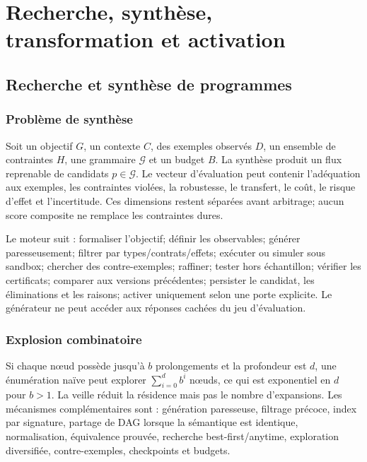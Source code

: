 \documentclass[11pt,a4paper,openany]{book}
\theoremstyle{definition}
\theoremstyle{plain}
\theoremstyle{remark}
\begin{document}
\part{Recherche, synthèse, transformation et activation}
\chapter{Recherche et synthèse de programmes}
\section{Problème de synthèse}
Soit un objectif $G$, un contexte $C$, des exemples observés $D$, un ensemble de contraintes $H$, une grammaire $\mathcal G$ et un budget $B$. La synthèse produit un flux reprenable de candidats $p\in\mathcal G$. Le vecteur d'évaluation peut contenir l'adéquation aux exemples, les contraintes violées, la robustesse, le transfert, le coût, le risque d'effet et l'incertitude. Ces dimensions restent séparées avant arbitrage; aucun score composite ne remplace les contraintes dures.

Le moteur suit : formaliser l'objectif; définir les observables; générer paresseusement; filtrer par types/contrats/effets; exécuter ou simuler sous sandbox; chercher des contre-exemples; raffiner; tester hors échantillon; vérifier les certificats; comparer aux versions précédentes; persister le candidat, les éliminations et les raisons; activer uniquement selon une porte explicite. Le générateur ne peut accéder aux réponses cachées du jeu d'évaluation.

\section{Explosion combinatoire}
Si chaque nœud possède jusqu'à $b$ prolongements et la profondeur est $d$, une énumération naïve peut explorer $\sum_{i=0}^{d}b^i$ nœuds, ce qui est exponentiel en $d$ pour $b>1$. La veille réduit la résidence mais pas le nombre d'expansions. Les mécanismes complémentaires sont : génération paresseuse, filtrage précoce, index par signature, partage de DAG lorsque la sémantique est identique, normalisation, équivalence prouvée, recherche best-first/anytime, exploration diversifiée, contre-exemples, checkpoints et budgets.
\end{document}
